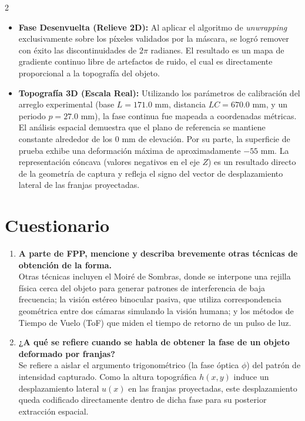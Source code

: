 \documentclass[letterpaper]{article}
\begin{document}
\begin{multicols}{2}
\begin{itemize}
			\item \textbf{Fase Desenvuelta (Relieve 2D):} Al aplicar el algoritmo de \textit{unwrapping} exclusivamente sobre los píxeles validados por la máscara, se logró remover con éxito las discontinuidades de $2\pi$ radianes. El resultado es un mapa de gradiente continuo libre de artefactos de ruido, el cual es directamente proporcional a la topografía del objeto.
			
			\item \textbf{Topografía 3D (Escala Real):} Utilizando los parámetros de calibración del arreglo experimental (base $L = 171.0\text{ mm}$, distancia $LC = 670.0\text{ mm}$, y un periodo $p = 27.0\text{ mm}$), la fase continua fue mapeada a coordenadas métricas. El análisis espacial demuestra que el plano de referencia se mantiene constante alrededor de los $0\text{ mm}$ de elevación. Por su parte, la superficie de prueba exhibe una deformación máxima de aproximadamente $-55\text{ mm}$. La representación cóncava (valores negativos en el eje $Z$) es un resultado directo de la geometría de captura y refleja el signo del vector de desplazamiento lateral de las franjas proyectadas.
		\end{itemize}
		

		
		
		\section*{Cuestionario}
		\begin{enumerate}
			\item \textbf{A parte de FPP, mencione y describa brevemente otras técnicas de obtención de la forma.}\\
			Otras técnicas incluyen el Moiré de Sombras, donde se interpone una rejilla física cerca del objeto para generar patrones de interferencia de baja frecuencia; la visión estéreo binocular pasiva, que utiliza correspondencia geométrica entre dos cámaras simulando la visión humana; y los métodos de Tiempo de Vuelo (ToF) que miden el tiempo de retorno de un pulso de luz.
			
			\item \textbf{¿A qué se refiere cuando se habla de obtener la fase de un objeto deformado por franjas?}\\
			Se refiere a aislar el argumento trigonométrico (la fase óptica $\phi$) del patrón de intensidad capturado. Como la altura topográfica $h(x,y)$ induce un desplazamiento lateral $u(x)$ en las franjas proyectadas, este desplazamiento queda codificado directamente dentro de dicha fase para su posterior extracción espacial.
			

\end{enumerate}
\end{multicols}
\end{document}
